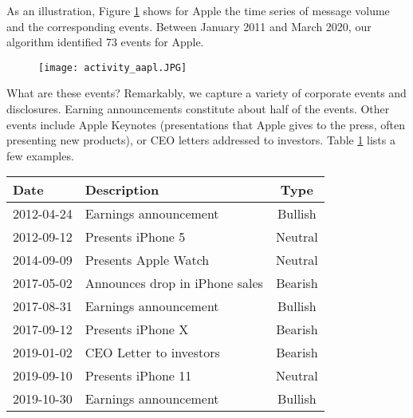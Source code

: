 As an illustration, Figure \ref{fig:activityaapl} shows for Apple the time series of message volume and the corresponding events. Between January 2011 and March 2020, our algorithm identified 73 events for Apple. 
\begin{figure}[h!]
    \centering
    \texttt{[image: activity\_aapl.JPG]}
    \label{fig:activityaapl}
\end{figure}
What are these events? Remarkably, we capture a variety of corporate events and disclosures. Earning announcements constitute about half of the events. Other events include Apple Keynotes (presentations that Apple gives to the press, often presenting new products), or CEO letters addressed to investors. Table \ref{tab:event_aapl} lists a few examples.


\begin{table}[h]
\centering
\begin{tabular}{l|l|c}
Date         & Description & Type\\
\hline  
2012-04-24  & Earnings announcement & Bullish\\
2012-09-12  & Presents iPhone 5 & Neutral \\
2014-09-09  & Presents Apple Watch & Neutral \\
2017-05-02  & Announces drop in iPhone sales & Bearish \\
2017-08-31  & Earnings announcement & Bullish \\
2017-09-12  & Presents iPhone X & Bearish \\
2019-01-02  & CEO Letter to investors & Bearish \\
2019-09-10  & Presents iPhone 11 & Neutral \\
2019-10-30  & Earnings announcement & Bullish \\
\end{tabular}
\label{tab:event_aapl}
\end{table}




